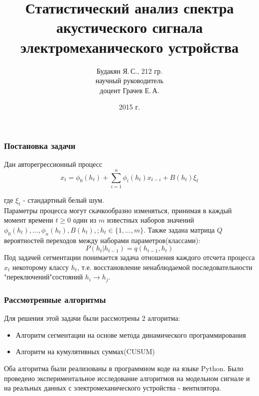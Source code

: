 \documentclass[9pt]{beamer}
\begin{document}
\title{Статистический анализ спектра акустического сигнала электромеханического устройства}
\author{Будакян Я.\,С., 212 гр. \\ научный руководитель\\доцент Грачев Е.\,А.}
\date{2015 г.} 

\maketitle

\begin{frame}\frametitle{Постановка задачи} 
Дан авторегрессионный процесс
$$x_t = \phi_0(h_t) + \sum_{i=1}^{n} \phi_i(h_t)x_{t-i} + B(h_t)\xi_t$$

где $\xi_t$ - стандартный белый шум.\\
Параметры процесса могут скачкообразно изменяться, принимая в каждый момент времени $t\geq 0$ один  из $m$ известных наборов значений  $\phi_0(h_t),\dots,\phi_n(h_t), B(h_t),;h_t \in \{1,\dots,m\}$.
Также задана матрица $Q$ вероятностей переходов между наборами параметров(классами):
$$P(h_t|h_{t-1}) = q(h_{t-1}, h_t)$$
Под задачей сегментации понимается задача отношения каждого отсчета процесса $x_t$ некоторому классу $h_t$, т.е. восстановление ненаблюдаемой последовательности "переключений"\space состояний $h_i \longrightarrow h_j$.
\end{frame}

\begin{frame}\frametitle{Рассмотренные алгоритмы}
Для решения этой задачи были рассмотрены 2 алгоритма:
\begin{itemize}
\item Алгоритм сегментации на основе метода динамического программирования
\item Алгоритм на кумулятивных суммах(CUSUM)
\end{itemize}
Оба алгоритма были реализованы в программном коде на языке Python. Было проведено экспериментальное исследование алгоритмов на модельном сигнале и на реальных данных с электромеханического устройства - вентилятора.
\end{frame}
\end{document}
